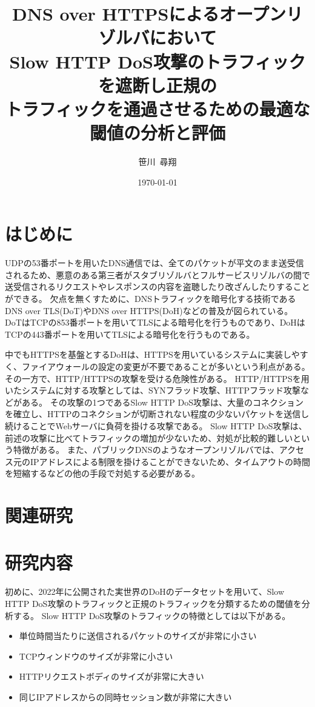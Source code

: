 \documentclass[twocolumn,article]{jlreq}
\title{DNS over HTTPSによるオープンリゾルバにおいて\\Slow HTTP DoS攻撃のトラフィックを遮断し正規の\\トラフィックを通過させるための最適な閾値の分析と評価}
\author{笹川~尋翔}
\date{\today}
\begin{document}
\maketitle

\section{はじめに}\label{sec:intro}
UDPの53番ポートを用いたDNS通信では、全てのパケットが平文のまま送受信されるため、悪意のある第三者がスタブリゾルバとフルサービスリゾルバの間で送受信されるリクエストやレスポンスの内容を盗聴したり改ざんしたりすることができる。%
欠点を無くすために、DNSトラフィックを暗号化する技術であるDNS over TLS(DoT)やDNS over HTTPS(DoH)などの普及が図られている。%
DoTはTCPの853番ポートを用いてTLSによる暗号化を行うものであり、DoHはTCPの443番ポートを用いてTLSによる暗号化を行うものである。%

中でもHTTPSを基盤とするDoHは、HTTPSを用いているシステムに実装しやすく、ファイアウォールの設定の変更が不要であることが多いという利点がある。%
その一方で、HTTP/HTTPSの攻撃を受ける危険性がある。%
HTTP/HTTPSを用いたシステムに対する攻撃としては、SYNフラッド攻撃、HTTPフラッド攻撃などがある。%
その攻撃の1つであるSlow HTTP DoS攻撃は、大量のコネクションを確立し、HTTPのコネクションが切断されない程度の少ないパケットを送信し続けることでWebサーバに負荷を掛ける攻撃である。%
Slow HTTP DoS攻撃は、前述の攻撃に比べてトラフィックの増加が少ないため、対処が比較的難しいという特徴がある。
また、パブリックDNSのようなオープンリゾルバでは、アクセス元のIPアドレスによる制限を掛けることができないため、タイムアウトの時間を短縮するなどの他の手段で対処する必要がある。

\section{関連研究}\label{sec:relation}


\section{研究内容}
初めに、2022年に公開された実世界のDoHのデータセット\cite{Jerabek2022}を用いて、Slow HTTP DoS攻撃のトラフィックと正規のトラフィックを分類するための閾値を分析する。%
Slow HTTP DoS攻撃のトラフィックの特徴としては以下がある。%

\begin{itemize}
  \item 単位時間当たりに送信されるパケットのサイズが非常に小さい
  \item TCPウィンドウのサイズが非常に小さい
  \item HTTPリクエストボディのサイズが非常に大きい
  \item 同じIPアドレスからの同時セッション数が非常に大きい
\end{itemize}
\end{document}
